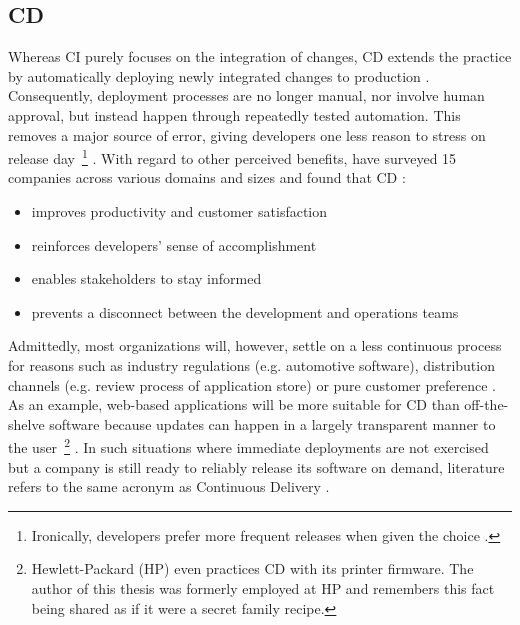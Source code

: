 \begin{appendices}
\subsection{\acl{CD}}
\label{sec:continuous-deployment}

Whereas \ac{CI} purely focuses on the integration of changes, \ac{CD} extends the practice by automatically deploying newly integrated changes to production \cite[p.~64]{leppanen2015highways} \cite[p.~21]{savor2016continuous}. Consequently, deployment processes are no longer manual, nor involve human approval, but instead happen through repeatedly tested automation. This removes a major source of error, giving developers one less reason to stress on release day~\footnote{Ironically, developers prefer more frequent releases when given the choice \cite[p.~21]{savor2016continuous}.} \cite[pp.~79--80]{virmani2015understanding} \cite[p.~53]{chen2015continuous}. With regard to other perceived benefits, \citeauthor{leppanen2015highways} have surveyed 15 companies across various domains and sizes and found that \ac{CD} \cite[pp.~66--67]{leppanen2015highways}:

\begin{itemize}
  \item improves productivity and customer satisfaction
  \item reinforces developers' sense of accomplishment
  \item enables stakeholders to stay informed
  \item prevents a disconnect between the development and operations teams
\end{itemize}

Admittedly, most organizations will, however, settle on a less continuous process for reasons such as industry regulations (e.g. automotive software), distribution channels (e.g. review process of application store) or pure customer preference \cite[pp.~68--69]{leppanen2015highways}. As an example, web-based applications will be more suitable for \ac{CD} than off-the-shelve software because updates can happen in a largely transparent manner to the user~\footnote{Hewlett-Packard (HP) even practices \ac{CD} with its printer firmware. The author of this thesis was formerly employed at HP and remembers this fact being shared as if it were a secret family recipe.} \cite[p.~22]{savor2016continuous}. In such situations where immediate deployments are not exercised but a company is still ready to reliably release its software on demand, literature refers to the same acronym as Continuous Delivery \cite[p.~50]{chen2015continuous}.


\end{appendices}
